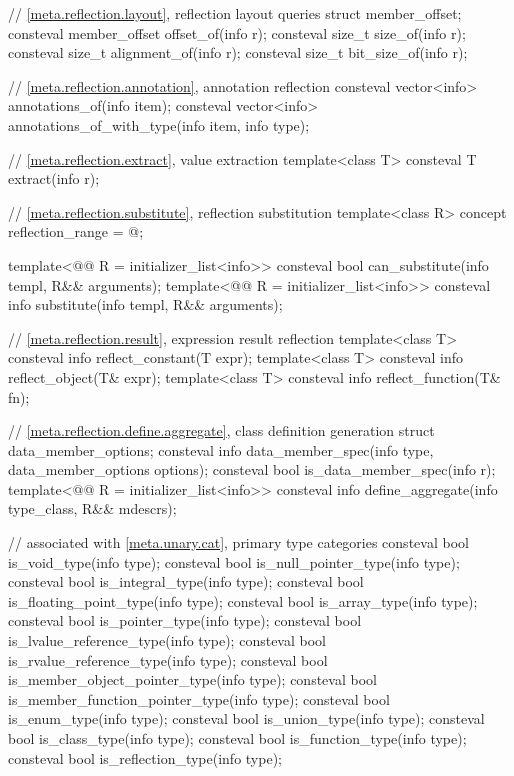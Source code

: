 \begin{codeblock}
{  // \ref{meta.reflection.layout}, reflection layout queries
  struct member_offset;
  consteval member_offset offset_of(info r);
  consteval size_t size_of(info r);
  consteval size_t alignment_of(info r);
  consteval size_t bit_size_of(info r);

  // \ref{meta.reflection.annotation}, annotation reflection
  consteval vector<info> annotations_of(info item);
  consteval vector<info> annotations_of_with_type(info item, info type);

  // \ref{meta.reflection.extract}, value extraction
  template<class T>
    consteval T extract(info r);

  // \ref{meta.reflection.substitute}, reflection substitution
  template<class R>
    concept reflection_range = @\seebelow@;

  template<@@ R = initializer_list<info>>
    consteval bool can_substitute(info templ, R&& arguments);
  template<@@ R = initializer_list<info>>
    consteval info substitute(info templ, R&& arguments);

  // \ref{meta.reflection.result}, expression result reflection
  template<class T>
    consteval info reflect_constant(T expr);
  template<class T>
    consteval info reflect_object(T& expr);
  template<class T>
    consteval info reflect_function(T& fn);

  // \ref{meta.reflection.define.aggregate}, class definition generation
  struct data_member_options;
  consteval info data_member_spec(info type, data_member_options options);
  consteval bool is_data_member_spec(info r);
  template<@@ R = initializer_list<info>>
    consteval info define_aggregate(info type_class, R&& mdescrs);

  // associated with \ref{meta.unary.cat}, primary type categories
  consteval bool is_void_type(info type);
  consteval bool is_null_pointer_type(info type);
  consteval bool is_integral_type(info type);
  consteval bool is_floating_point_type(info type);
  consteval bool is_array_type(info type);
  consteval bool is_pointer_type(info type);
  consteval bool is_lvalue_reference_type(info type);
  consteval bool is_rvalue_reference_type(info type);
  consteval bool is_member_object_pointer_type(info type);
  consteval bool is_member_function_pointer_type(info type);
  consteval bool is_enum_type(info type);
  consteval bool is_union_type(info type);
  consteval bool is_class_type(info type);
  consteval bool is_function_type(info type);
  consteval bool is_reflection_type(info type);

}
\end{codeblock}
